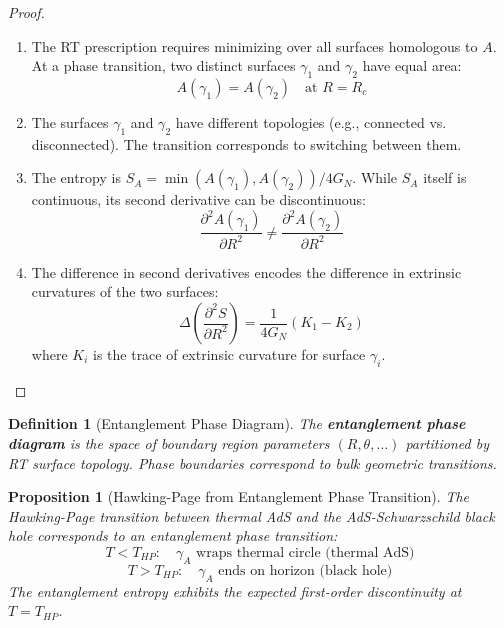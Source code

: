 \documentclass[12pt,a4paper]{article}
\newtheorem{definition}[theorem]{Definition}
\newtheorem{proposition}[theorem]{Proposition}
\begin{document}
\begin{proof}
\begin{enumerate}
    \item The RT prescription requires minimizing over all surfaces homologous to $A$. At a phase transition, two distinct surfaces $\gamma_1$ and $\gamma_2$ have equal area:
    \begin{equation}
    A(\gamma_1) = A(\gamma_2) \quad \text{at } R = R_c
    \end{equation}
    
    \item The surfaces $\gamma_1$ and $\gamma_2$ have different topologies (e.g., connected vs. disconnected). The transition corresponds to switching between them.
    
    \item The entropy is $S_A = \min(A(\gamma_1), A(\gamma_2))/4G_N$. While $S_A$ itself is continuous, its second derivative can be discontinuous:
    \begin{equation}
    \frac{\partial^2 A(\gamma_1)}{\partial R^2} \neq \frac{\partial^2 A(\gamma_2)}{\partial R^2}
    \end{equation}
    
    \item The difference in second derivatives encodes the difference in extrinsic curvatures of the two surfaces:
    \begin{equation}
    \Delta\left(\frac{\partial^2 S}{\partial R^2}\right) = \frac{1}{4G_N}(K_1 - K_2)
    \end{equation}
    where $K_i$ is the trace of extrinsic curvature for surface $\gamma_i$.
\end{enumerate}
\end{proof}

\begin{definition}[Entanglement Phase Diagram]
The \textbf{entanglement phase diagram} is the space of boundary region parameters $(R, \theta, \ldots)$ partitioned by RT surface topology. Phase boundaries correspond to bulk geometric transitions.
\end{definition}

\begin{proposition}[Hawking-Page from Entanglement Phase Transition]
The Hawking-Page transition between thermal AdS and the AdS-Schwarzschild black hole corresponds to an entanglement phase transition:
\begin{equation}
T < T_{HP}: \quad \gamma_A \text{ wraps thermal circle (thermal AdS)}
\end{equation}
\begin{equation}
T > T_{HP}: \quad \gamma_A \text{ ends on horizon (black hole)}
\end{equation}
The entanglement entropy exhibits the expected first-order discontinuity at $T = T_{HP}$.
\end{proposition}
\end{document}
